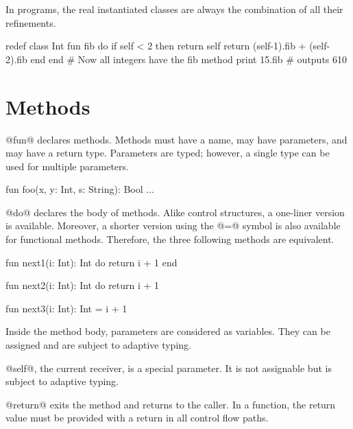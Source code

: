 In programs, the real instantiated classes are always the combination of all their refinements.

\begin{lst}
redef class Int
	fun fib
	do
		if self < 2 then return self
		return (self-1).fib + (self-2).fib
	end
end
# Now all integers have the fib method
print 15.fib # outputs 610
\end{lst}

\section{Methods}\label{fun}\label{self}\label{return}

@fun@ declares methods.
Methods must have a name, may have parameters, and may have a return type.
Parameters are typed; however, a single type can be used for multiple parameters.
\begin{lst}
fun foo(x, y: Int, s: String): Bool ...
\end{lst}

@do@ declares the body of methods.
Alike control structures, a one-liner version is available.
Moreover, a shorter version using the @=@ symbol is also available for functional methods.
Therefore, the three following methods are equivalent. 
\begin{lst}
fun next1(i: Int): Int
do
	return i + 1
end

fun next2(i: Int): Int do return i + 1

fun next3(i: Int): Int = i + 1
\end{lst}

Inside the method body, parameters are considered as variables.
They can be assigned and are subject to adaptive typing.

@self@, the current receiver, is a special parameter.
It is not assignable but is subject to adaptive typing.

@return@ exits the method and returns to the caller.
In a function, the return value must be provided with a return in all control flow paths.

